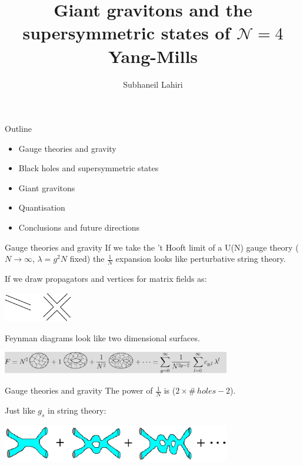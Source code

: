 \documentclass[%
ps,accumulate,
colorBG, slideColor,
total,
serpaggi
%
]{prosper}
\title {Giant gravitons and the supersymmetric states of  $\mathcal{N}=4$
Yang-Mills}
\author{Subhaneil Lahiri}
\newcommand{\vp}{\vspace{0.5cm}}
\newcommand{\ra}{\rightarrow}
\begin{document}
\maketitle


\begin{slide}{Outline}
%
 \begin{itemize}
    \item Gauge theories and gravity
    \item Black holes and supersymmetric states
    \item Giant gravitons
    \item Quantisation
    \item Conclusions and future directions
 \end{itemize}
%
\end{slide}


\begin{slide}{Gauge theories and gravity}
%
 If we take the 't Hooft limit of a U(N) gauge theory ($N\ra\infty$,
 $\lambda=g^2N$ fixed) the $\frac{1}{N}$ expansion looks like
 perturbative string theory.

 \vp If we draw propagators and vertices for matrix fields as:
 \begin{center}
    \includegraphics[width=3cm]{thooft.eps}
 \end{center}
 Feynman diagrams look like two dimensional surfaces.
 \begin{center}
    \includegraphics[width=10cm]{riem.eps}
 \end{center}
%
\end{slide}


\begin{slide}{Gauge theories and gravity}
%
  The power of $\frac{1}{N}$ is ($2\times \#\, holes - 2$).

  \vp Just like $g_s$ in string theory:
 \begin{center}
    \includegraphics[width=10cm]{pert.eps}
 \end{center}
%
\end{slide}
\end{document}
